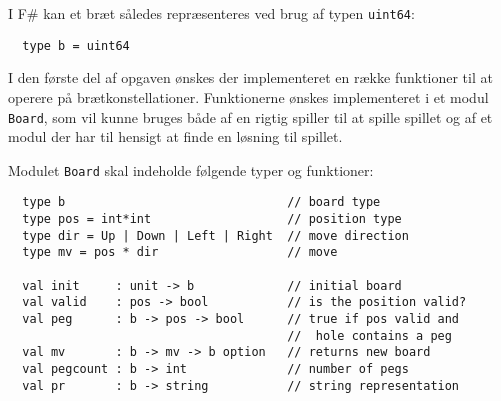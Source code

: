 I F\# kan et bræt således repræsenteres ved brug af typen \lstinline{uint64}:
\begin{lstlisting}
  type b = uint64
\end{lstlisting}

I den første del af opgaven ønskes der implementeret en række
funktioner til at operere på brætkonstellationer. Funktionerne ønskes
implementeret i et modul \lstinline{Board}, som vil kunne bruges både
af en rigtig spiller til at spille spillet og af et modul der har til
hensigt at finde en løsning til spillet.

Modulet \lstinline{Board} skal indeholde følgende typer og funktioner:
\begin{lstlisting}
  type b                               // board type
  type pos = int*int                   // position type
  type dir = Up | Down | Left | Right  // move direction
  type mv = pos * dir                  // move

  val init     : unit -> b             // initial board
  val valid    : pos -> bool           // is the position valid?
  val peg      : b -> pos -> bool      // true if pos valid and
                                       //  hole contains a peg
  val mv       : b -> mv -> b option   // returns new board
  val pegcount : b -> int              // number of pegs
  val pr       : b -> string           // string representation
\end{lstlisting}

